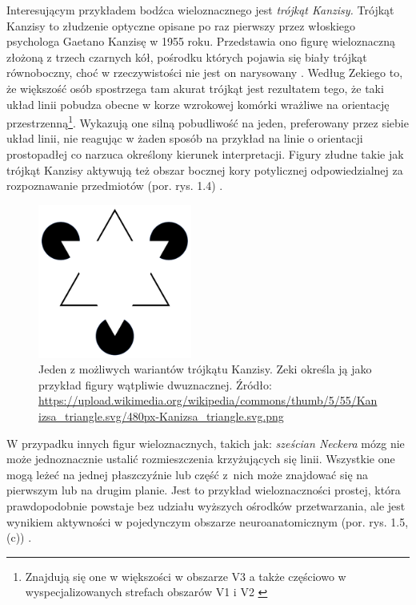 \documentclass[licencjacka]{kdypl}
\begin{document}
Interesującym przykładem bodźca wieloznacznego jest \textit{trójkąt Kanzisy.} Trójkąt Kanzisy to złudzenie optyczne opisane po raz pierwszy przez włoskiego psychologa Gaetano Kanzisę w 1955 roku. Przedstawia ono figurę wieloznaczną złożoną z trzech czarnych kół, pośrodku których pojawia się biały trójkąt równoboczny, choć w rzeczywistości nie jest on narysowany \citep[s. 434]{Wieloznacznosc}. Według Zekiego to, że większość osób spostrzega tam akurat trójkąt jest rezultatem tego, że taki układ linii pobudza obecne w korze wzrokowej komórki wrażliwe na orientację przestrzenną\footnote{Znajdują się one w większości w obszarze V3 a także częściowo w wyspecjalizowanych strefach obszarów V1 i V2 \citep[s. 434]{Wieloznacznosc}}. Wykazują one silną pobudliwość na jeden, preferowany przez siebie układ linii, nie reagując w żaden sposób na przykład na linie o orientacji prostopadłej co narzuca określony kierunek interpretacji. Figury złudne takie jak trójkąt Kanzisy aktywują też obszar bocznej kory potylicznej odpowiedzialnej za rozpoznawanie przedmiotów (por. rys. 1.4) \citep[s. 86-87]{Zeki}.
\begin{figure}[H]
\includegraphics[width=0.45\textwidth]{triangle}
\centering
\caption{Jeden z możliwych wariantów trójkątu Kanzisy. Zeki określa ją jako przykład figury wątpliwie dwuznacznej.
Źródło: \url{https://upload.wikimedia.org/wikipedia/commons/thumb/5/55/Kanizsa_triangle.svg/480px-Kanizsa_triangle.svg.png}}

\end{figure}

W przypadku innych figur wieloznacznych, takich jak: \textit{sześcian Neckera} mózg nie może jednoznacznie ustalić rozmieszczenia krzyżujących się linii. Wszystkie one mogą leżeć na jednej płaszczyźnie lub część z~nich może znajdować się na pierwszym lub na drugim planie. Jest to przykład wieloznaczności prostej, która prawdopodobnie powstaje bez udziału wyższych ośrodków przetwarzania, ale jest wynikiem aktywności w pojedynczym obszarze neuroanatomicznym (por. rys. 1.5, (c)) \citep[s. 437-438]{Wieloznacznosc}. 
\end{document}

